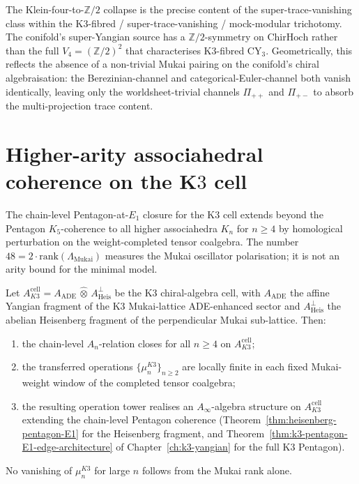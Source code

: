 \begin{remark}
\label{rem:conifold-collapse-geometric}
The Klein-four-to-$\mathbb{Z}/2$ collapse is the precise content of
the super-trace-vanishing class within the K$3$-fibred /
super-trace-vanishing / mock-modular trichotomy. The conifold's
super-Yangian source has a $\mathbb{Z}/2$-symmetry on
$\mathrm{ChirHoch}$ rather than the full
$V_4 = (\mathbb{Z}/2)^2$ that characterises K$3$-fibred CY$_3$.
Geometrically, this reflects the absence of a non-trivial Mukai
pairing on the conifold's chiral algebraisation: the
Berezinian-channel and categorical-Euler-channel both vanish
identically, leaving only the worldsheet-trivial channels
$\Pi_{++}$ and $\Pi_{+-}$ to absorb the multi-projection trace
content.
\end{remark}


\section{Higher-arity associahedral coherence on the K\texorpdfstring{$3$}{3} cell}
\label{sec:k3-cell-Ainfty-coherence}

The chain-level Pentagon-at-$E_1$ closure for the K$3$ cell extends
beyond the Pentagon $K_5$-coherence to all higher associahedra
$K_n$ for $n \geq 4$ by homological perturbation on the
weight-completed tensor coalgebra.  The number
$48 = 2 \cdot \mathrm{rank}(\Lambda_{\mathrm{Mukai}})$ measures the
Mukai oscillator polarisation; it is not an arity bound for the
minimal model.

\begin{theorem}
\label{thm:k3-cell-Ainfty-coherence}
Let $A_{K3}^{\mathrm{cell}} = A_{\mathrm{ADE}} \,\widehat{\otimes}\,
A_{\mathrm{Heis}}^\perp$ be the K$3$ chiral-algebra cell, with
$A_{\mathrm{ADE}}$ the affine Yangian fragment of the K$3$
Mukai-lattice ADE-enhanced sector and $A_{\mathrm{Heis}}^\perp$ the
abelian Heisenberg fragment of the perpendicular Mukai sub-lattice.
Then:
\begin{enumerate}[label=\textup{(\alph*)}]
\item the chain-level $A_n$-relation closes for all $n \geq 4$ on
 $A_{K3}^{\mathrm{cell}}$;
\item the transferred operations
 $\{\mu_n^{K3}\}_{n \geq 2}$ are locally finite in each fixed
 Mukai-weight window of the completed tensor coalgebra;
\item the resulting operation tower realises an $A_\infty$-algebra
 structure on $A_{K3}^{\mathrm{cell}}$ extending the chain-level
 Pentagon coherence
 \textup{(}Theorem~\ref{thm:heisenberg-pentagon-E1} for the
 Heisenberg fragment, and
 Theorem~\ref{thm:k3-pentagon-E1-edge-architecture} of
 Chapter~\ref{ch:k3-yangian} for the full K$3$
 Pentagon\textup{).}
\end{enumerate}
No vanishing of $\mu_n^{K3}$ for large $n$ follows from the Mukai rank
alone.
\end{theorem}

